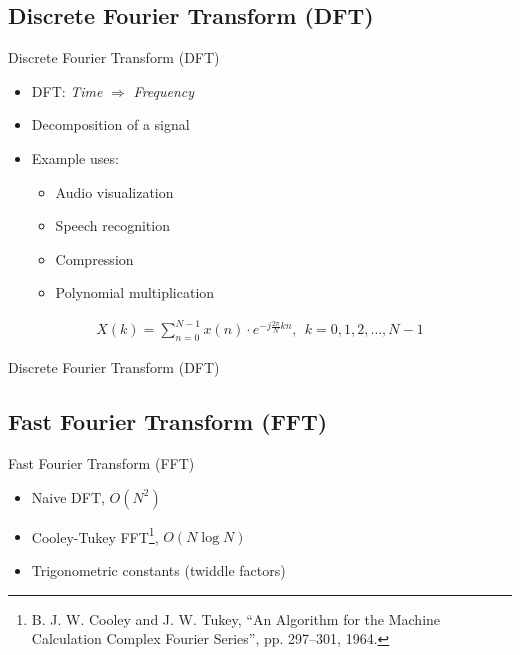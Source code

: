 \documentclass[xcolor={table}]{beamer}
\begin{document}
\subsection{Discrete Fourier Transform (DFT)}
\begin{frame}{Discrete Fourier Transform (DFT)}
    \begin{itemize}
        \item DFT: \textit{Time} $\Rightarrow$ \textit{Frequency}
        \item Decomposition of a signal
        \item Example uses:
            \begin{itemize}
                \item Audio visualization
                \item Speech recognition
                \item Compression
                \item Polynomial multiplication
            \end{itemize}
    \end{itemize}

    \begin{align*}
        X\left(k\right) = \sum\limits_{n=0}^{N-1}x\left(n\right)\cdot e^{-j\frac{2\pi}{N}kn},\ \ k = 0,1,2,\dots,N-1
    \end{align*}
\end{frame}

\begin{frame}{Discrete Fourier Transform (DFT)}
    
\end{frame}

\subsection{Fast Fourier Transform (FFT)}
\begin{frame}{Fast Fourier Transform (FFT)}
    \begin{itemize}
        \item Naive DFT, $O(N^2)$
        \item Cooley-Tukey FFT\footnote{B. J. W. Cooley and J. W. Tukey, \enquote{An Algorithm for the Machine Calculation Complex Fourier Series}, pp. 297–301, 1964.}, $O(N\log{}N)$
        \item Trigonometric constants (twiddle factors)
    \end{itemize}
\end{frame}
%     
\end{document}
